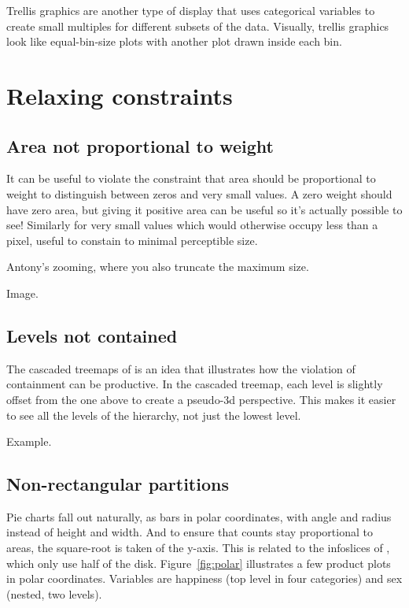 \documentclass[letterpaper,oneside]{scrartcl}
\begin{document}

Trellis graphics are another type of display that uses categorical variables to create small multiples for different subsets of the data. Visually, trellis graphics look like equal-bin-size plots with another plot drawn inside each bin. 

\section{Relaxing constraints}
\label{sec:relax}

\subsection{Area not proportional to weight}

It can be useful to violate the constraint that area should be proportional to weight to distinguish between zeros and very small values.  A zero weight should have zero area, but giving it positive area can be useful so it's actually possible to see!  Similarly for very small values which would otherwise occupy less than a pixel, useful to constain to minimal perceptible size.

Antony's zooming, where you also truncate the maximum size.

Image.

\subsection{Levels not contained}

The cascaded treemaps of \citet{lu:2008} is an idea that illustrates how the violation of containment can be productive.  In the cascaded treemap, each level is slightly offset from the one above to create a pseudo-3d perspective.
This makes it easier to see all the levels of the hierarchy, not just the lowest level.

Example.

\subsection{Non-rectangular partitions}

Pie charts fall out naturally, as bars in polar coordinates, with angle and radius instead of height and width. And to ensure that counts stay proportional to areas, the square-root is taken of the y-axis. This is related to the infoslices of \citet{andrews:1998}, which only use half of the disk. Figure~\ref{fig:polar} illustrates a few product plots in polar coordinates.  Variables are happiness (top level in four categories) and sex (nested, two levels).
\end{document}
